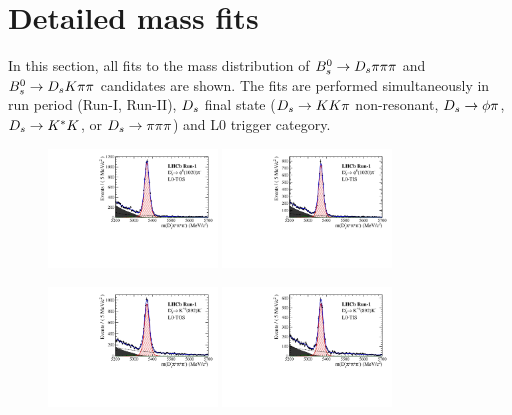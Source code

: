 \clearpage
\section{Detailed mass fits}
\label{sec:DetailedMassfits}

\setcounter{figure}{0}
\setcounter{table}{0}

\renewcommand{\thefigure}{B.\arabic{figure}}

In this section, all fits to the mass distribution of ${{B}^0_{s}}\rightarrow{\ensuremath{{D}_{s}}}{\ensuremath{\pi}}{\ensuremath{\pi}}{\ensuremath{\pi}}$ and ${{B}^0_{s}}\rightarrow{\ensuremath{{D}_{s}}}{\ensuremath{K}}{\ensuremath{\pi}}{\ensuremath{\pi}}$ candidates are shown. 
The fits are performed simultaneously 
in run period (Run-I, Run-II), 
${{D}_{s}}$ final state  (${{D}_{s}}\rightarrow{\ensuremath{K}}{\ensuremath{K}}{\ensuremath{\pi}}$ non-resonant, ${{D}_{s}}\rightarrow\phi\pi$, ${{D}_{s}}\rightarrow{\ensuremath{{K}^*}}{\ensuremath{K}}$, or ${{D}_{s}}\rightarrow{\ensuremath{\pi}}{\ensuremath{\pi}}{\ensuremath{\pi}}$) 
and \textsf{L0} trigger category. 

\begin{figure}[h]
\centering
\includegraphics[height=!,width=0.4\textwidth]{figs/MassFit/norm_Run1_phipi_t0.pdf}
\includegraphics[height=!,width=0.4\textwidth]{figs/MassFit/norm_Run1_phipi_t1.pdf}

\includegraphics[height=!,width=0.4\textwidth]{figs/MassFit/norm_Run1_KsK_t0.pdf}
\includegraphics[height=!,width=0.4\textwidth]{figs/MassFit/norm_Run1_KsK_t1.pdf}


\end{figure}

